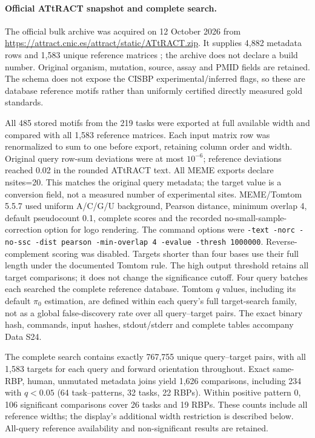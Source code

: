 \documentclass[11pt]{article}
\begin{document}
\paragraph{Official ATtRACT snapshot and complete search.} The official bulk archive was acquired on 12 October 2026 from \url{https://attract.cnic.es/attract/static/ATtRACT.zip}. It supplies 4,882 metadata rows and 1,583 unique reference matrices \citep{giudice2016attract}; the archive does not declare a build number. Original organism, mutation, source, assay and PMID fields are retained. The schema does not expose the CISBP experimental/inferred flags, so these are database reference motifs rather than uniformly certified directly measured gold standards.

All 485 stored motifs from the 219 tasks were exported at full available width and compared with all 1,583 reference matrices. Each input matrix row was renormalized to sum to one before export, retaining column order and width. Original query row-sum deviations were at most $10^{-6}$; reference deviations reached 0.02 in the rounded ATtRACT text. All MEME exports declare nsites=20. This matches the original query metadata; the target value is a conversion field, not a measured number of experimental sites. MEME/Tomtom 5.5.7 used uniform A/C/G/U background, Pearson distance, minimum overlap 4, default pseudocount 0.1, complete scores and the recorded no-small-sample-correction option for logo rendering. The command options were \texttt{-text -norc -no-ssc -dist pearson -min-overlap 4 -evalue -thresh 1000000}. Reverse-complement scoring was disabled. Targets shorter than four bases use their full length under the documented Tomtom rule. The high output threshold retains all target comparisons; it does not change the significance cutoff. Four query batches each searched the complete reference database. Tomtom $q$ values, including its default $\pi_0$ estimation, are defined within each query's full target-search family, not as a global false-discovery rate over all query--target pairs. The exact binary hash, commands, input hashes, stdout/stderr and complete tables accompany Data S24.

The complete search contains exactly 767,755 unique query--target pairs, with all 1,583 targets for each query and forward orientation throughout. Exact same-RBP, human, unmutated metadata joins yield 1,626 comparisons, including 234 with $q<0.05$ (64 task--patterns, 32 tasks, 22 RBPs). Within positive pattern 0, 106 significant comparisons cover 26 tasks and 19 RBPs. These counts include all reference widths; the display's additional width restriction is described below. All-query reference availability and non-significant results are retained.
\end{document}
